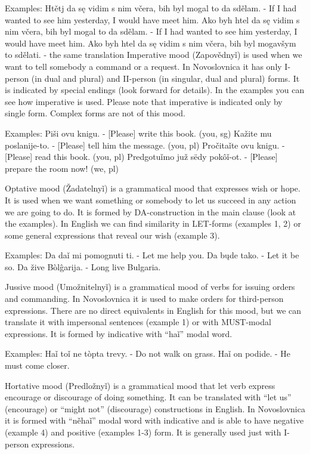 Examples:
Htětj da sę vidim s nim včera, bih byl mogal to da sdělam. - If  I had wanted to see him yesterday, I would have meet him.
Ako byh htel da sę vidim s nim včera, bih byl mogal to da sdělam. - If  I had wanted to see him yesterday, I would have meet him.
Ako byh htel da sę vidim s nim včera, bih byl mogavšym to sdělati. - the same translation
Imperative mood (Zapovědnyǐ)  is used when we want to tell somebody a command or a request. In Novoslovnica it has only I-person (in dual and plural) and II-person (in singular, dual and plural) forms. It is indicated by special endings (look forward for details). In the examples you can see how imperative is used.
Please note that imperative is indicated only by single form. Complex forms are not of this mood.

Examples:
Piši ovu knigu. - [Please] write this book. (you, sg)
Kažite mu poslanije-to. - [Please] tell him the message. (you, pl)
Pročitaǐte ovu knigu. - [Please] read this book. (you, pl)
Predgotuǐmo juž sëdy pokôǐ-ot. - [Please] prepare the room now! (we, pl)

Optative mood (Žadatelnyǐ) is a grammatical mood that expresses wish or hope. It is used when we want something or somebody to let us succeed in any action we are going to do. It is formed by DA-construction in the main clause (look at the examples). 
In English we can find similarity in LET-forms (examples 1, 2) or some general expressions that reveal our wish (example 3).

Examples:
Da daǐ mi pomognuti ti. - Let me help you.
Da bųde tako. - Let it be so.
Da žive Bòlĝarija. - Long live Bulgaria.

Jussive mood (Umožnitelnyǐ) is a grammatical mood of verbs for issuing orders and commanding. In Novoslovnica it is used to make orders for third-person expressions. There are no direct equivalents in English for this mood, but we can translate it with impersonal sentences (example 1) or with MUST-modal expressions. It is formed by indicative with “haǐ” modal word.

Examples:
Haǐ toǐ ne tòpta trevy. - Do not walk on grass.
Haǐ on podide. - He must come closer.

Hortative mood (Predložnyǐ)  is a grammatical mood that let verb express encourage or discourage of doing something. It can be translated with “let us” (encourage) or “might not” (discourage) constructions in English. In Novoslovnica it is formed with “něhaǐ” modal word with indicative and is able to have negative (example 4) and positive (examples 1-3) form. It is generally used just with I-person expressions.


